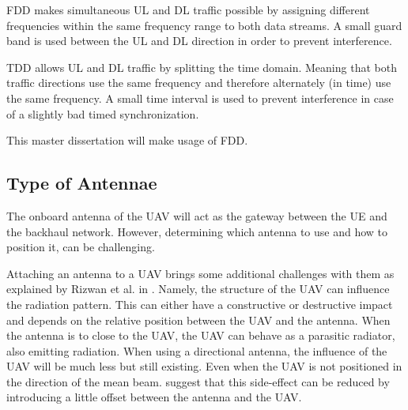 \gls{FDD} makes simultaneous \gls{UL} and \gls{DL} traffic possible by assigning different frequencies within the same frequency range 
to both data streams. A small guard band is used between the \gls{UL} and \gls{DL} direction in order to prevent interference.

\gls{TDD} allows  \gls{UL} and \gls{DL} traffic by splitting the time domain. Meaning that both traffic directions use the same frequency and therefore
alternately (in time) use the same frequency. A small time interval is used to prevent interference in case of a slightly bad timed synchronization.

This master dissertation will make usage of \gls{FDD}.

\subsection{Type of Antennae} %

The onboard antenna of the \gls{UAV} will act as the gateway between the \gls{UE} and the backhaul network.
However, determining which antenna to use and how to position it, can be challenging.

Attaching an antenna to a \gls{UAV} brings some additional challenges with them as explained by Rizwan et al. in \cite{A1}.
Namely, the structure of the \gls{UAV} can influence the radiation pattern.  
This can either have a constructive or destructive impact and depends on the relative position between the \gls{UAV} and
the antenna.
When the antenna is to close to the \gls{UAV}, the \gls{UAV} can behave as a parasitic radiator, also emitting radiation.
When using a directional antenna, the influence of the \gls{UAV} will be much less but still existing. Even when the \gls{UAV} is not 
positioned in the direction of the mean beam. \cite{A1} suggest that this side-effect can be reduced by introducing a little offset 
between the antenna and the \gls{UAV}.

